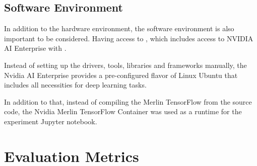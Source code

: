 \subsection{Software Environment}

In addition to the hardware environment, the software environment is also important to be considered.
Having access to  \cite{NvidiaStartups}, 
which includes access to NVIDIA AI Enterprise \cite{NvidiaAiEnterprise} with \cite{NvidiaNGC}.

Instead of setting up the drivers, tools, libraries and frameworks manually, 
the Nvidia AI Enterprise provides a pre-configured flavor of Linux Ubuntu that includes all necessities for deep learning tasks.

In addition to that, instead of compiling the Merlin TensorFlow from the source code, 
the Nvidia Merlin TensorFlow Container \cite{NvidiaMerlinTf} was used as a runtime for the experiment Jupyter notebook.



\section{Evaluation Metrics}